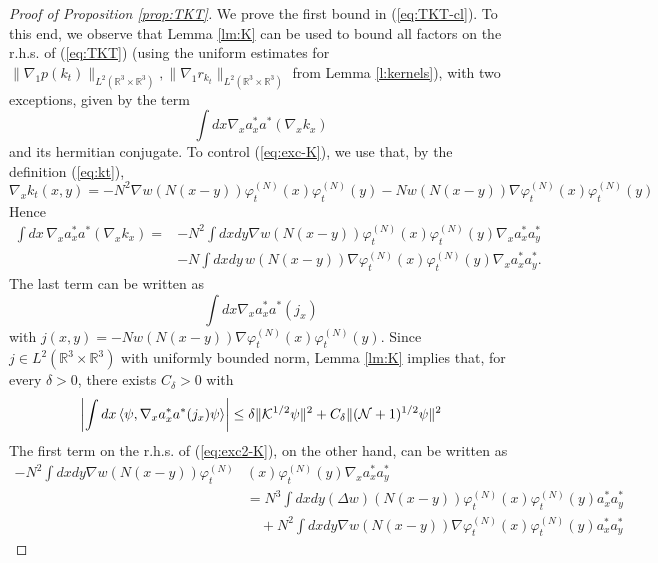 \documentclass[11pt,a4paper]{article}
\newcommand{\bR}{{\mathbb R}}
\newcommand{\cK}{{\cal K}}
\newcommand{\cN}{{\cal N}}
\begin{document}
\begin{proof}[Proof of Proposition \ref{prop:TKT}] 
We prove the first bound in (\ref{eq:TKT-cl}). To this end, we observe that Lemma \ref{lm:K} can be used to bound all factors on the r.h.s. of (\ref{eq:TKT})  (using the uniform estimates for $\| \nabla_1 p (k_t) \|_{L^2 (\bR^3 \times \bR^3)}, \| \nabla_1 r_{k_t} \|_{L^2 (\bR^3 \times \bR^3)}$ from Lemma \ref{l:kernels}), with two exceptions, given by the term
\begin{equation}\label{eq:exc-K} \int dx \nabla_x a^*_x a^* (\nabla_x k_x) \end{equation}
and its hermitian conjugate. To control (\ref{eq:exc-K}), we use that, by the definition (\ref{eq:kt}), 
\[ \nabla_x k_t (x,y) = - N^2 \nabla w (N (x-y)) \varphi_t^{(N)} (x) \varphi_t^{(N)} (y) - N w (N (x-y)) \nabla\varphi_t^{(N)} (x) \varphi_t^{(N)} (y)  \]
Hence
\begin{equation}\label{eq:exc2-K} \begin{split} 
\int dx \, \nabla_x a_x^* a^* (\nabla_x k_x)  = &- N^2 \int dx dy \nabla w (N (x-y)) \varphi_t^{(N)} (x) \varphi_t^{(N)} (y) \nabla_x a^*_x a_y^* \\ &- N \int dx dy \, w(N (x-y)) \nabla \varphi_t^{(N)} (x) \varphi_t^{(N)} (y) \nabla_x a_x^* a_y^*.   \end{split}\end{equation}
The last term can be written as
\begin{equation} \int dx  \nabla_x a_x^* a^* (j_x) \end{equation}
with $j(x,y) = -N w(N (x-y)) \nabla \varphi_t^{(N)} (x) \varphi_t^{(N)} (y)$. Since $j \in L^2 (\bR^3 \times \bR^3)$ with uniformly bounded norm, Lemma \ref{lm:K} implies that, for every $\delta > 0$, there exists $C_\delta >0$ with
\begin{equation}\label{eq:exc3-K} \left| \int dx \, \langle \psi , \nabla_x a_x^* a^* (j_x) \psi \rangle \right| \leq \delta \| \cK^{1/2} \psi \|^2 + C_\delta \| (\cN + 1)^{1/2} \psi \|^2 \end{equation}
The first term on the r.h.s. of (\ref{eq:exc2-K}), on the other hand, can be written as
\[ \begin{split}
- N^2 \int dx dy \nabla w (N (x-y)) \varphi_t^{(N)} &(x) \varphi_t^{(N)} (y) \nabla_x a^*_x a_y^* \\ &=
 N^3 \int dx dy (\Delta w) (N (x-y)) \varphi_t^{(N)} (x) \varphi_t^{(N)} (y)
 a^*_x a_y^* \\ &\quad + N^2 \int dx dy \nabla w (N (x-y)) \nabla \varphi^{(N)}_t (x) \varphi_t^{(N)} (y) a_x^* a_y^* \end{split} \]

\end{proof}
\end{document}
